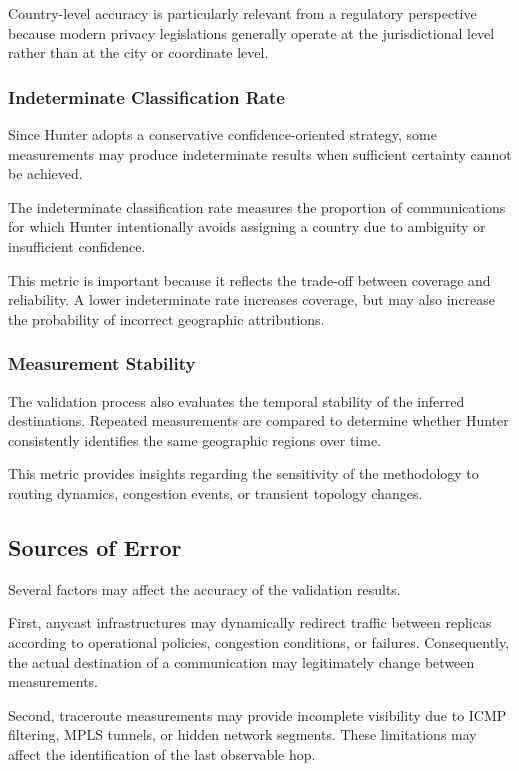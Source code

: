 Country-level accuracy is particularly relevant from a regulatory perspective because modern privacy legislations generally operate at the jurisdictional level rather than at the city or coordinate level.

\subsubsection{Indeterminate Classification Rate}

Since Hunter adopts a conservative confidence-oriented strategy, some measurements may produce indeterminate results when sufficient certainty cannot be achieved.

The indeterminate classification rate measures the proportion of communications for which Hunter intentionally avoids assigning a country due to ambiguity or insufficient confidence.

This metric is important because it reflects the trade-off between coverage and reliability. A lower indeterminate rate increases coverage, but may also increase the probability of incorrect geographic attributions.

\subsubsection{Measurement Stability}

The validation process also evaluates the temporal stability of the inferred destinations. Repeated measurements are compared to determine whether Hunter consistently identifies the same geographic regions over time.

This metric provides insights regarding the sensitivity of the methodology to routing dynamics, congestion events, or transient topology changes.

\subsection{Sources of Error}

Several factors may affect the accuracy of the validation results.

First, anycast infrastructures may dynamically redirect traffic between replicas according to operational policies, congestion conditions, or failures. Consequently, the actual destination of a communication may legitimately change between measurements.

Second, traceroute measurements may provide incomplete visibility due to ICMP filtering, MPLS tunnels, or hidden network segments. These limitations may affect the identification of the last observable hop.

